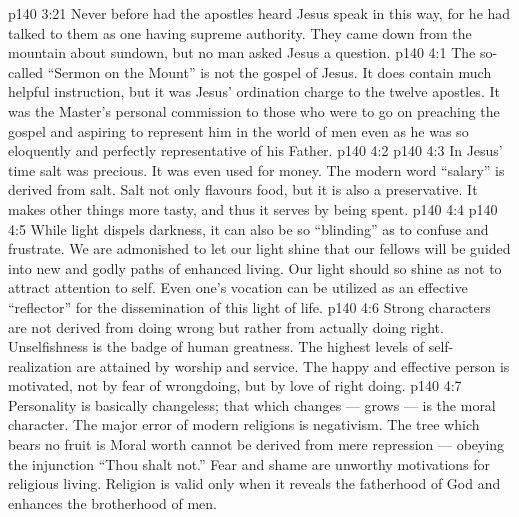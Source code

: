 \vs p140 3:21 \pc Never before had the apostles heard Jesus speak in this way, for he had talked to them as one having supreme authority. They came down from the mountain about sundown, but no man asked Jesus a question.
\vs p140 4:1 The so\hyp{}called “Sermon on the Mount” is not the gospel of Jesus. It does contain much helpful instruction, but it was Jesus’ ordination charge to the twelve apostles. It was the Master’s personal commission to those who were to go on preaching the gospel and aspiring to represent him in the world of men even as he was so eloquently and perfectly representative of his Father.
\vs p140 4:2 \pc {}
\vs p140 4:3 In Jesus’ time salt was precious. It was even used for money. The modern word “salary” is derived from salt. Salt not only flavours food, but it is also a preservative. It makes other things more tasty, and thus it serves by being spent.
\vs p140 4:4 \pc {}
\vs p140 4:5 While light dispels darkness, it can also be so “blinding” as to confuse and frustrate. We are admonished to let our light  shine that our fellows will be guided into new and godly paths of enhanced living. Our light should so shine as not to attract attention to self. Even one’s vocation can be utilized as an effective “reflector” for the dissemination of this light of life.
\vs p140 4:6 Strong characters are not derived from  doing wrong but rather from actually doing right. Unselfishness is the badge of human greatness. The highest levels of self\hyp{}realization are attained by worship and service. The happy and effective person is motivated, not by fear of wrongdoing, but by love of right doing.
\vs p140 4:7 \pc {} Personality is basically changeless; that which changes --- grows --- is the moral character. The major error of modern religions is negativism. The tree which bears no fruit is  Moral worth cannot be derived from mere repression --- obeying the injunction “Thou shalt not.” Fear and shame are unworthy motivations for religious living. Religion is valid only when it reveals the fatherhood of God and enhances the brotherhood of men.
